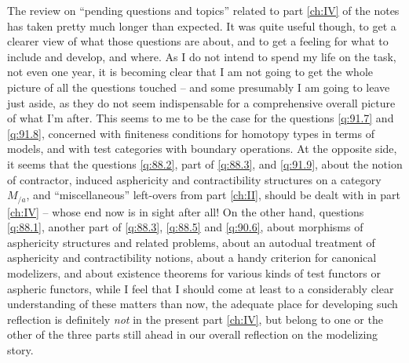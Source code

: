 \label{sec:92}%
The review on ``pending questions and topics'' related to part
\ref{ch:IV} of the notes has taken pretty much longer than
expected. It was quite useful though, to get a clearer view of what
those questions are about, and to get a feeling for what to include
and develop, and where. As I do not intend to spend my life on the
task, not even one year, it is becoming clear that I am not going to
get the whole picture of all the questions touched -- and some
presumably I am going to leave just aside, as they do not seem
indispensable for a comprehensive overall picture of what I'm
after. This seems to me to be the case for the questions \ref{q:91.7}
and \ref{q:91.8}, concerned with finiteness conditions for homotopy
types in terms of models, and with test categories with boundary
operations. At the opposite side, it seems that the questions
\ref{q:88.2}, part of \ref{q:88.3}, and \ref{q:91.9}, about the notion
of contractor, induced asphericity and contractibility structures on a
category $M_{/a}$, and ``miscellaneous'' left-overs from part
\ref{ch:II}, should be dealt with in part \ref{ch:IV} -- whose end now
is in sight after all!  On the other hand, questions \ref{q:88.1},
another part of \ref{q:88.3}, \ref{q:88.5} and \ref{q:90.6}, about
morphisms of asphericity structures and related problems, about an
autodual treatment of asphericity and contractibility notions, about a
handy criterion for canonical modelizers, and about existence theorems
for various kinds of test functors or aspheric functors, while I feel
that I should come at least to a considerably clear understanding of
these matters than now, the adequate place for developing such
reflection is definitely \emph{not} in the present part \ref{ch:IV},
but belong to one or the other of the three parts still ahead in our
overall reflection on the modelizing story.

